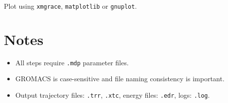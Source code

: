 Plot using \texttt{xmgrace}, \texttt{matplotlib} or \texttt{gnuplot}.

\section*{Notes}
\begin{itemize}
    \item All steps require \texttt{.mdp} parameter files.
    \item GROMACS is case-sensitive and file naming consistency is important.
    \item Output trajectory files: \texttt{.trr}, \texttt{.xtc}, energy files: \texttt{.edr}, logs: \texttt{.log}.
\end{itemize}
